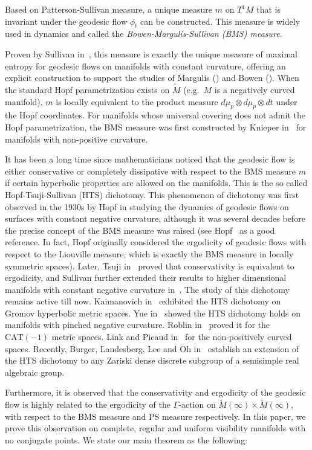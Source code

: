 \documentclass[reqno,11pt]{article}
\theoremstyle{definition}
\theoremstyle{remark}
\numberwithin{equation}{section}
\begin{document}
Based on Patterson-Sullivan measure, a unique measure $m$ on $T^1M$ that is invariant under the geodesic flow $\phi_t$ can be constructed. This measure is widely used in dynamics and called the \emph{Bowen-Margulis-Sullivan (BMS) measure}.

Proven by Sullivan in~\cite{Su2, Su}, this measure is exactly the unique measure of maximal entropy for geodesic flows on manifolds with constant curvature, offering an explicit construction to support the studies of Margulis (\cite{Ma}) and Bowen (\cite{Bow}).
When the standard Hopf parametrization exists on $\widetilde{M}$ (e.g.~$M$ is a negatively curved manifold), $m$ is locally equivalent to the product measure $d\mu_p\otimes d\mu_p\otimes dt$ under the Hopf coordinates. For manifolds whose universal covering does not admit the Hopf parametrization, the BMS measure was first constructed by Knieper in~\cite{Kn4} for manifolds with non-positive curvature. 

It has been a long time since mathematicians noticed that the geodesic flow is either conservative or completely dissipative with respect to the BMS measure $m$ if certain hyperbolic properties are allowed on the manifolds. This is the so called Hopf-Tsuji-Sullivan (HTS) dichotomy. This phenomenon of dichotomy was first observed in the 1930s by Hopf in studying the dynamics of geodesic flows on surfaces with constant negative curvature, although it was several decades before the precise concept of the BMS measure was raised (see Hopf~\cite{Ho} as a good reference. In fact, Hopf originally considered the ergodicity of geodesic flows with respect to the Liouville measure, which is exactly the BMS measure in locally symmetric spaces). Later, Tsuji in~\cite{Ts} proved that conservativity is equivalent to ergodicity, and Sullivan further extended their results to higher dimensional manifolds with constant negative curvature in~\cite{Su2}. The study of this dichotomy remains active till now. Kaimanovich in~\cite{Ka2} exhibited the HTS dichotomy on Gromov hyperbolic metric spaces. Yue in~\cite{Yue1} showed the HTS dichotomy holds on manifolds with pinched negative curvature. Roblin in~\cite{Rb} proved it for the $\text{CAT}(-1)$ metric spaces. Link and Picaud in~\cite{Li2, LP} for the non-positively curved spaces. Recently, Burger, Landesberg, Lee and Oh in~\cite{BLLO} establish an extension of the HTS dichotomy to any Zariski dense discrete subgroup of a semisimple real algebraic group.

Furthermore, it is observed that the conservativity and ergodicity of the geodesic flow is highly related to the ergodicity of the $\Gamma$-action on $\widetilde{M}(\infty)\times\widetilde{M}(\infty)$, with respect to the BMS measure and PS measure respectively. In this paper, we prove this observation on complete, regular and uniform visibility manifolds with no conjugate points. We state our main theorem as the following:
\end{document}
